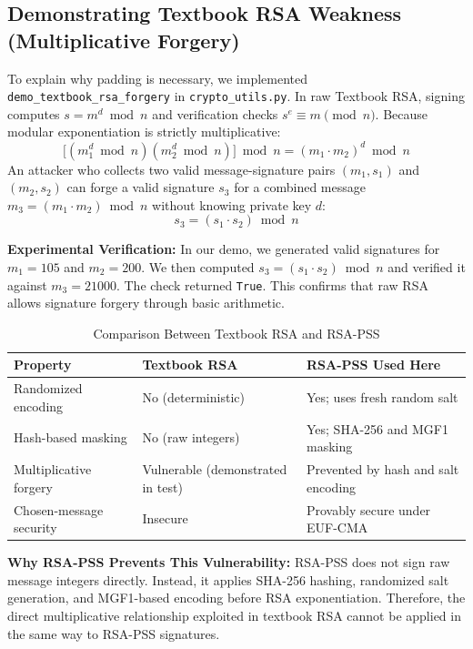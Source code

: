 \documentclass[10pt,a4paper]{article}
\begin{document}
\subsection{Demonstrating Textbook RSA Weakness (Multiplicative Forgery)}
To explain why padding is necessary, we implemented \texttt{demo\_textbook\_rsa\_forgery} in \texttt{crypto\_utils.py}. In raw Textbook RSA, signing computes $s = m^d \bmod n$ and verification checks $s^e \equiv m \pmod n$. Because modular exponentiation is strictly multiplicative:
\begin{equation}
    \big[(m_1^d \bmod n)(m_2^d \bmod n)\big] \bmod n = (m_1 \cdot m_2)^d \bmod n
\end{equation}
An attacker who collects two valid message-signature pairs $(m_1, s_1)$ and $(m_2, s_2)$ can forge a valid signature $s_3$ for a combined message $m_3 = (m_1 \cdot m_2) \bmod n$ without knowing private key $d$:
\begin{equation}
    s_3 = (s_1 \cdot s_2) \bmod n
\end{equation}

\noindent \textbf{Experimental Verification:} In our demo, we generated valid signatures for $m_1 = 105$ and $m_2 = 200$. We then computed $s_3 = (s_1 \cdot s_2) \bmod n$ and verified it against $m_3 = 21000$. The check returned \texttt{True}. This confirms that raw RSA allows signature forgery through basic arithmetic.

\begin{table}[!htbp]
\centering
\caption{Comparison Between Textbook RSA and RSA-PSS}
\small
\begin{tabularx}{\textwidth}{>{\raggedright\arraybackslash}p{3.3cm} >{\raggedright\arraybackslash}p{4.3cm} >{\raggedright\arraybackslash}X}
\toprule
\textbf{Property} & \textbf{Textbook RSA} & \textbf{RSA-PSS Used Here} \\
\midrule
Randomized encoding & No (deterministic) & Yes; uses fresh random salt \\
Hash-based masking & No (raw integers) & Yes; SHA-256 and MGF1 masking \\
Multiplicative forgery & Vulnerable (demonstrated in test) & Prevented by hash and salt encoding \\
Chosen-message security & Insecure & Provably secure under EUF-CMA \cite{bellare1996} \\
\bottomrule
\end{tabularx}
\end{table}

\noindent \textbf{Why RSA-PSS Prevents This Vulnerability:} RSA-PSS does not sign raw message integers directly. Instead, it applies SHA-256 hashing, randomized salt generation, and MGF1-based encoding before RSA exponentiation. Therefore, the direct multiplicative relationship exploited in textbook RSA cannot be applied in the same way to RSA-PSS signatures.
\end{document}
